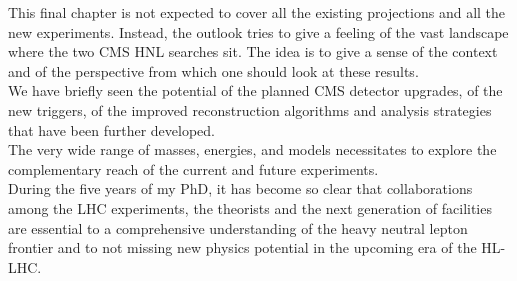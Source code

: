 This final chapter is not expected to cover all the existing projections and all the new
experiments. 
Instead, the outlook tries to give a feeling of the vast landscape
where the two CMS HNL searches sit. The idea is to give a sense of the
context and of the perspective from which one should look at these results. \\
We have briefly seen the potential of the planned CMS detector
upgrades, of the new triggers, of the improved reconstruction algorithms and analysis strategies that
have been further developed. \\
The very wide range of masses, energies, and models necessitates to
explore the complementary reach of the current and future experiments.\\
During the five years of my PhD, it has become so clear that collaborations
among the LHC experiments, the theorists and the next generation of
facilities are essential to a comprehensive
understanding of the heavy neutral lepton frontier and to not missing
new physics potential in the upcoming era of the HL-LHC.























